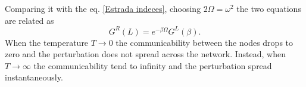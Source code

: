 Comparing it with the eq. \eqref{Estrada indeces}, choosing $2\Omega =\omega^2$ the two equations are related as
\begin{equation}
    G^R(L) = e^{-\beta\Omega}G^L(\beta).
\end{equation}
When the temperature $T \rightarrow 0$ the communicability between the nodes drops to zero and the perturbation does not spread across the network. Instead, when $T \rightarrow \infty$ the communicability tend to infinity and the perturbation spread instantaneously.  
